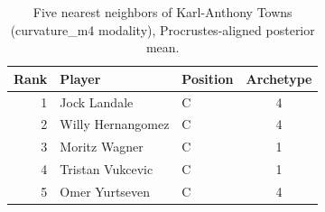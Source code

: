 \begin{table}[htbp]
  \centering\small
  \begin{tabular}{rllc}
    \toprule
    Rank & Player & Position & Archetype \\
    \midrule
    1 & Jock Landale & C & 4 \\
    2 & Willy Hernangomez & C & 4 \\
    3 & Moritz Wagner & C & 1 \\
    4 & Tristan Vukcevic & C & 1 \\
    5 & Omer Yurtseven & C & 4 \\
    \bottomrule
  \end{tabular}
  \caption{Five nearest neighbors of Karl-Anthony Towns (curvature_m4 modality), Procrustes-aligned posterior mean.}
  \label{tab:Karl_Anthony_Towns_neighbors_curvature_m4}
\end{table}

